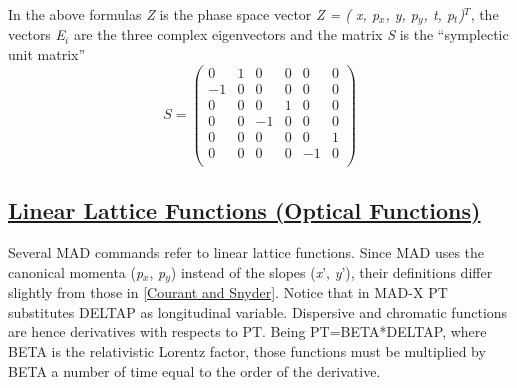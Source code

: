 In the above formulas \textit{Z} is the phase space vector
\textit{Z = ( x, p$_x$, y, p$_y$, t, p$_t$)$^T$}, the vectors
\textit{E$_i$} are the three complex eigenvectors and  
the matrix \textit{S} is the ``symplectic unit matrix'' 
\[
S =
 \begin{pmatrix}
  0 & 1 & 0 & 0 & 0 & 0 \\
  -1 & 0 & 0 & 0 & 0 & 0 \\
  0 & 0 & 0 & 1 & 0 & 0 \\
  0 & 0 & -1 & 0 & 0 & 0 \\
  0 & 0 & 0 & 0 & 0 & 1 \\
  0 & 0 & 0 & 0 & -1 & 0 \\
 \end{pmatrix}
\]


\subsection{\href{linear}{Linear Lattice Functions (Optical Functions)}} 
\label{subsec:tables_linear}

Several MAD commands refer to linear lattice functions. Since MAD uses
the canonical momenta (\textit{p$_x$}, \textit{p$_y$}) instead of the
slopes (\textit{x}', \textit{y}'), their definitions differ slightly
from those in \href{bibliography.html#courant}{[Courant and
    Snyder]}. Notice that in MAD-X PT substitutes DELTAP as longitudinal
variable. Dispersive and chromatic functions are hence derivatives with
respects to PT. Being PT=BETA*DELTAP, where BETA is the relativistic
Lorentz factor, those functions must be multiplied by BETA a number of
time equal to the order of the derivative. 

